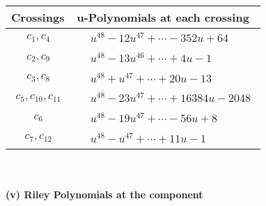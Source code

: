\documentclass[1p]{elsarticle_modified}
\theoremstyle{definition}
\begin{document}
\begin{tabular}{m{50pt}|m{274pt}}
Crossings & \hspace{64pt}u-Polynomials at each crossing \\
\hline $$\begin{aligned}c_{1},c_{4}\end{aligned}$$&$\begin{aligned}
&u^{48}-12 u^{47}+\cdots-352 u+64
\end{aligned}$\\
\hline $$\begin{aligned}c_{2},c_{9}\end{aligned}$$&$\begin{aligned}
&u^{48}-13 u^{46}+\cdots+4 u-1
\end{aligned}$\\
\hline $$\begin{aligned}c_{3},c_{8}\end{aligned}$$&$\begin{aligned}
&u^{48}+u^{47}+\cdots+20 u-13
\end{aligned}$\\
\hline $$\begin{aligned}c_{5},c_{10},c_{11}\end{aligned}$$&$\begin{aligned}
&u^{48}-23 u^{47}+\cdots+16384 u-2048
\end{aligned}$\\
\hline $$\begin{aligned}c_{6}\end{aligned}$$&$\begin{aligned}
&u^{48}-19 u^{47}+\cdots-56 u+8
\end{aligned}$\\
\hline $$\begin{aligned}c_{7},c_{12}\end{aligned}$$&$\begin{aligned}
&u^{48}- u^{47}+\cdots+11 u-1
\end{aligned}$\\
\hline
\end{tabular}\\~\\
\newpage\renewcommand{\arraystretch}{1}
\flushleft \textbf{(v) Riley Polynomials at the component}\newline \\
\end{document}
